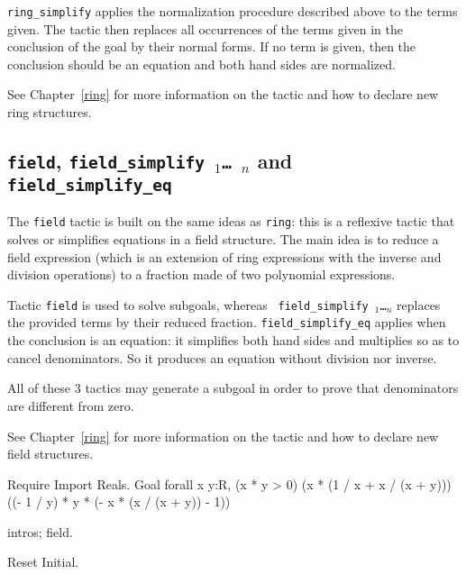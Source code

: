 {\tt ring\_simplify} applies the normalization procedure described
above to the terms given. The tactic then replaces all occurrences of
the terms given in the conclusion of the goal by their normal
forms. If no term is given, then the conclusion should be an equation
and both hand sides are normalized.

See Chapter~\ref{ring} for more information on the tactic and how to
declare new ring structures.

\subsection{{\tt field}, {\tt field\_simplify \term$_1$\dots\ \term$_n$}
            and {\tt field\_simplify\_eq}
}

The {\tt field} tactic is built on the same ideas as {\tt ring}: this
is a reflexive tactic that solves or simplifies equations in a field
structure. The main idea is to reduce a field expression (which is an
extension of ring expressions with the inverse and division
operations) to a fraction made of two polynomial expressions.

Tactic {\tt field} is used to solve subgoals, whereas {\tt
  field\_simplify \term$_1$\dots\term$_n$} replaces the provided terms
by their reduced fraction. {\tt field\_simplify\_eq} applies when the
conclusion is an equation: it simplifies both hand sides and multiplies
so as to cancel denominators. So it produces an equation without
division nor inverse.

All of these 3 tactics may generate a subgoal in order to prove that
denominators are different from zero.

See Chapter~\ref{ring} for more information on the tactic and how to
declare new field structures.

\Example
\begin{coq_example*}
Require Import Reals.
Goal forall x y:R,
    (x * y > 0)%
    (x * (1 / x + x / (x + y)))%
    ((- 1 / y) * y * (- x * (x / (x + y)) - 1))%
\end{coq_example*}

\begin{coq_example}
intros; field.
\end{coq_example}

\begin{coq_eval}
Reset Initial.
\end{coq_eval}

